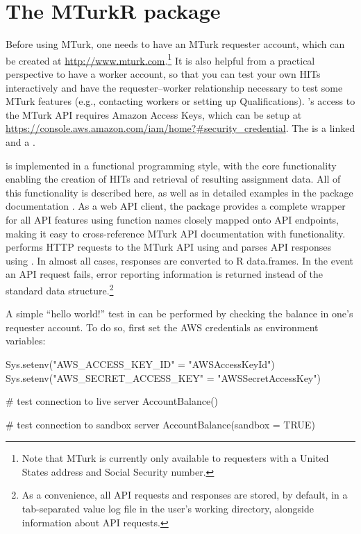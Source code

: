 \section{The MTurkR package}
Before using MTurk, one needs to have an MTurk requester account, which can be created at \url{http://www.mturk.com}.\footnote{Note that MTurk is currently only available to requesters with a United States address and Social Security number.} It is also helpful from a practical perspective to have a worker account, so that you can test your own HITs interactively and have the requester--worker relationship necessary to test some MTurk features (e.g., contacting workers or setting up Qualifications). 's access to the MTurk API requires Amazon Access Keys, which can be setup at \url{https://console.aws.amazon.com/iam/home?#security_credential}. The  is a linked  and a .

 is implemented in a functional programming style, with the core functionality enabling the creation of HITs and retrieval of resulting assignment data. All of this functionality is described here, as well as in detailed examples in the  package documentation \citep{Leeper2012c}. As a web API client, the package provides a complete wrapper for all API features using function names closely mapped onto API endpoints, making it easy to cross-reference MTurk API documentation with  functionality.  performs HTTP requests to the MTurk API using  \citep{Ooms2015} and parses API responses using  \citep{TempleLang2012b}. In almost all cases, responses are converted to R data.frames. In the event an API request fails, error reporting information is returned instead of the standard data structure.\footnote{As a convenience, all API requests and responses are stored, by default, in a tab-separated value log file in the user's working directory, alongside information about API requests.}

A simple ``hello world!'' test in  can be performed by checking the balance in one's requester account. To do so, first set the AWS credentials as environment variables:

\begin{example}
Sys.setenv("AWS_ACCESS_KEY_ID" = "AWSAccessKeyId")
Sys.setenv("AWS_SECRET_ACCESS_KEY" = "AWSSecretAccessKey")

# test connection to live server
AccountBalance()

# test connection to sandbox server
AccountBalance(sandbox = TRUE)
\end{example}

